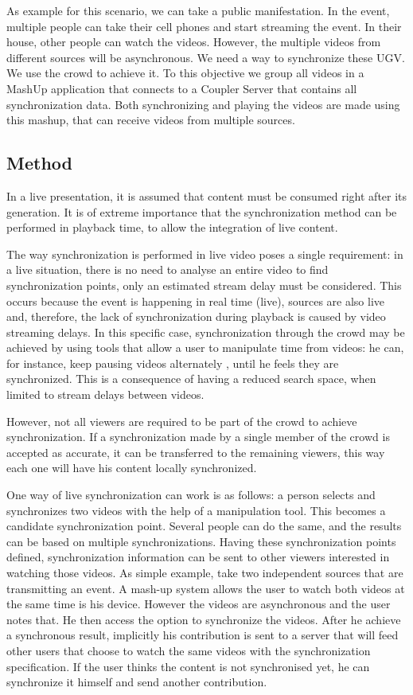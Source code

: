 \documentclass{sig-alternate-05-2015}
\begin{document}
As example for this scenario, we can take a public manifestation. In the event, multiple people can take their cell phones and start streaming the event. In their house, other people can watch the videos. However, the multiple videos from different sources will be asynchronous. We need a way to synchronize these UGV. We use the crowd to achieve it. To this objective we group all videos in a MashUp application that connects to a Coupler Server that contains all synchronization data. Both synchronizing and playing the videos are made using this mashup, that can receive videos from multiple sources.

\subsection{Method}
In a live presentation, it is assumed that content must be consumed right after its generation. It is of extreme importance that the synchronization method can be performed in playback time, to allow the integration of live content.

The way synchronization is performed in live video poses a single requirement: in a live situation, there is no need to analyse an entire video to find synchronization points, only an estimated stream delay must be considered. This occurs because the event is happening in real time (live), sources are also live and, therefore, the lack of synchronization during playback is caused by video streaming delays. In this specific case, synchronization through the crowd may be achieved by using tools that allow a user to manipulate time from videos: he can, for instance, keep pausing videos alternately , until he feels they are synchronized. This is a consequence of having a reduced search space, when limited to stream delays between videos.

However, not all viewers are required to be part of the crowd to achieve synchronization. If a synchronization made by a single member of the crowd is accepted as accurate, it can be transferred to the remaining viewers, this way each one will have his content locally synchronized.

One way of live synchronization can work is as follows: a person selects and synchronizes two videos with the help of a manipulation tool. This becomes a candidate synchronization point. Several people can do the same, and the results can be based on multiple synchronizations. Having these synchronization points defined, synchronization information can be sent to other viewers interested in watching those videos. As simple example, take two independent sources that are transmitting an event. A mash-up system allows the user to watch both videos at the same time is his device. However the videos are asynchronous and the user notes that. He then access the option to synchronize the videos. After he achieve a synchronous result, implicitly his contribution is sent to a server that will feed other users that choose to watch the same videos with the synchronization specification. If the user thinks the content is not synchronised yet, he can synchronize it himself and send another contribution.
\end{document}
